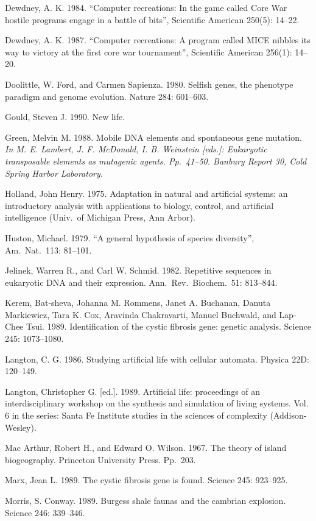 Dewdney, A. K.  1984. ``Computer recreations:  In the game called Core
War hostile programs engage in a battle of bits'',  Scientific American
250(5): 14--22.

Dewdney, A. K.  1987.  ``Computer recreations:  A program called MICE
nibbles its way to victory at the first core war tournament'', Scientific
American 256(1): 14--20.

Doolittle, W. Ford, and Carmen Sapienza.  1980.  Selfish genes, the phenotype
paradigm and genome evolution.  Nature 284: 601--603.

Gould, Steven J.  1990.  New life.

Green, Melvin M.  1988.  Mobile DNA elements and spontaneous gene mutation.
\it In \rm M. E. Lambert, J. F. McDonald, I. B. Weinstein [eds.]:
Eukaryotic transposable elements as mutagenic agents.  Pp.\ 41--50.
Banbury Report 30, Cold Spring Harbor Laboratory.

Holland, John Henry.  1975.  Adaptation in natural and artificial systems:
an introductory analysis with applications to biology, control, and
artificial intelligence (Univ.\ of Michigan Press, Ann Arbor).

Huston, Michael.  1979.  ``A general hypothesis of species diversity'',
Am.\ Nat.\ 113: 81--101.

Jelinek, Warren R., and Carl W. Schmid.  1982.  Repetitive sequences in
eukaryotic DNA and their expression.  Ann.\ Rev.\ Biochem.\ 51: 813--844.

Kerem, Bat-sheva, Johanna M. Rommens, Janet A. Buchanan, Danuta Markiewicz,
Tara K. Cox, Aravinda Chakravarti, Manuel Buchwald, and Lap-Chee Tsui.
1989.  Identification of the cystic fibrosis gene: genetic analysis.
Science 245: 1073--1080.

Langton, C. G.  1986.  Studying artificial life with cellular automata.
Physica 22D: 120--149.

Langton, Christopher G. [ed.].  1989.  Artificial life: proceedings of an
interdisciplinary workshop on the synthesis and simulation of living systems.
Vol. 6 in the series: Santa Fe Institute studies in the sciences of
complexity (Addison-Wesley).

Mac Arthur, Robert H., and Edward O. Wilson.  1967.  The theory of
island biogeography.  Princeton University Press.  Pp.\ 203.

Marx, Jean L.  1989.  The cystic fibrosis gene is found.  Science 245:
923--925.

Morris, S. Conway.  1989.  Burgess shale faunas and the cambrian explosion.
Science 246: 339--346.

